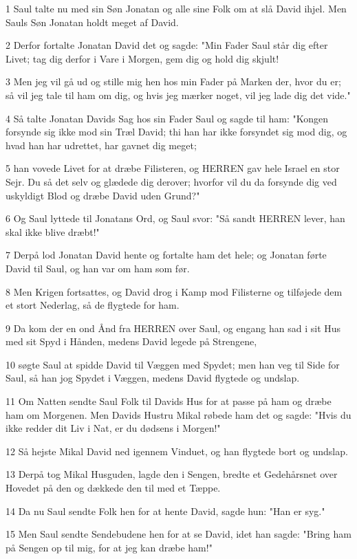 \par 1 Saul talte nu med sin Søn Jonatan og alle sine Folk om at slå David ihjel. Men Sauls Søn Jonatan holdt meget af David.
\par 2 Derfor fortalte Jonatan David det og sagde: "Min Fader Saul står dig efter Livet; tag dig derfor i Vare i Morgen, gem dig og hold dig skjult!
\par 3 Men jeg vil gå ud og stille mig hen hos min Fader på Marken der, hvor du er; så vil jeg tale til ham om dig, og hvis jeg mærker noget, vil jeg lade dig det vide."
\par 4 Så talte Jonatan Davids Sag hos sin Fader Saul og sagde til ham: "Kongen forsynde sig ikke mod sin Træl David; thi han har ikke forsyndet sig mod dig, og hvad han har udrettet, har gavnet dig meget;
\par 5 han vovede Livet for at dræbe Filisteren, og HERREN gav hele Israel en stor Sejr. Du så det selv og glædede dig derover; hvorfor vil du da forsynde dig ved uskyldigt Blod og dræbe David uden Grund?"
\par 6 Og Saul lyttede til Jonatans Ord, og Saul svor: "Så sandt HERREN lever, han skal ikke blive dræbt!"
\par 7 Derpå lod Jonatan David hente og fortalte ham det hele; og Jonatan førte David til Saul, og han var om ham som før.
\par 8 Men Krigen fortsattes, og David drog i Kamp mod Filisterne og tilføjede dem et stort Nederlag, så de flygtede for ham.
\par 9 Da kom der en ond Ånd fra HERREN over Saul, og engang han sad i sit Hus med sit Spyd i Hånden, medens David legede på Strengene,
\par 10 søgte Saul at spidde David til Væggen med Spydet; men han veg til Side for Saul, så han jog Spydet i Væggen, medens David flygtede og undslap.
\par 11 Om Natten sendte Saul Folk til Davids Hus for at passe på ham og dræbe ham om Morgenen. Men Davids Hustru Mikal røbede ham det og sagde: "Hvis du ikke redder dit Liv i Nat, er du dødsens i Morgen!"
\par 12 Så hejste Mikal David ned igennem Vinduet, og han flygtede bort og undslap.
\par 13 Derpå tog Mikal Husguden, lagde den i Sengen, bredte et Gedehårsnet over Hovedet på den og dækkede den til med et Tæppe.
\par 14 Da nu Saul sendte Folk hen for at hente David, sagde hun: "Han er syg."
\par 15 Men Saul sendte Sendebudene hen for at se David, idet han sagde: "Bring ham på Sengen op til mig, for at jeg kan dræbe ham!"
